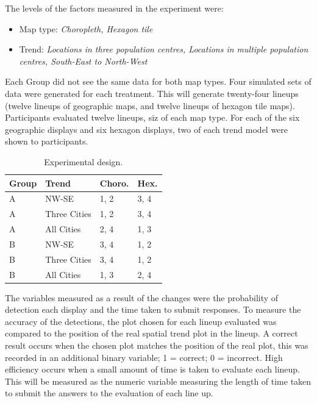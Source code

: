 \documentclass[conference,final,]{IEEEtran}
\providecommand{\tightlist}{%
  \setlength{\itemsep}{0pt}\setlength{\parskip}{0pt}}
\begin{document}
The levels of the factors measured in the experiment were:

\begin{itemize}
\tightlist
\item
  Map type: \emph{Choropleth, Hexagon tile}
\item
  Trend: \emph{Locations in three population centres, Locations in
  multiple population centres, South-East to North-West}
\end{itemize}

Each Group did not see the same data for both map types. Four simulated
sets of data were generated for each treatment. This will generate
twenty-four lineups (twelve lineups of geographic maps, and twelve
lineups of hexagon tile maps). Participants evaluated twelve lineups,
siz of each map type. For each of the six geographic displays and six
hexagon displays, two of each trend model were shown to participants.

\begin{table}

\caption{\label{tab:exp_design}Experimental design.}
\centering
\begin{tabular}[t]{llll}
\toprule
Group & Trend & Choro. & Hex.\\
\midrule
A & NW-SE & 1, 2 & 3, 4\\
A & Three Cities & 1, 2 & 3, 4\\
A & All Cities & 2, 4 & 1, 3\\
B & NW-SE & 3, 4 & 1, 2\\
B & Three Cities & 3, 4 & 1, 2\\
\addlinespace
B & All Cities & 1, 3 & 2, 4\\
\bottomrule
\end{tabular}
\end{table}

The variables measured as a result of the changes were the probability
of detection each display and the time taken to submit responses. To
measure the accuracy of the detections, the plot chosen for each lineup
evaluated was compared to the position of the real spatial trend plot in
the lineup. A correct result occurs when the chosen plot matches the
position of the real plot, this was recorded in an additional binary
variable; 1 = correct; 0 = incorrect. High efficiency occurs when a
small amount of time is taken to evaluate each lineup. This will be
measured as the numeric variable measuring the length of time taken to
submit the answers to the evaluation of each line up.
\end{document}
